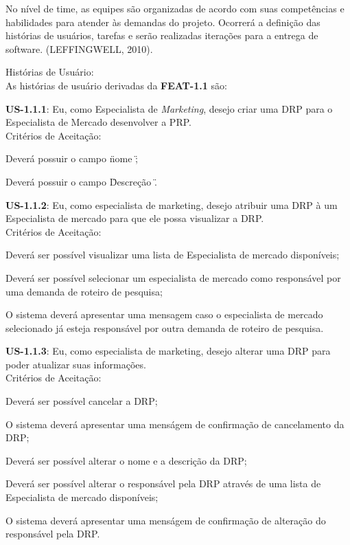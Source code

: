 			No nível de time, as equipes são organizadas de acordo com suas competências e habilidades para atender às demandas do projeto. Ocorrerá a definição das histórias de usuários, tarefas e serão realizadas iterações para a entrega de software. (LEFFINGWELL, 2010).

			\begin{itemize}
			{
				\item Histórias de Usuário:\\
				As histórias de usuário derivadas da \textbf{FEAT-1.1} são:
				\begin{itemize}
				{
					\item \textbf{US-1.1.1}: Eu, como Especialista de \textit{Marketing}, desejo criar uma DRP para o Especialista de Mercado desenvolver a PRP.\\
					Critérios de Aceitação:
						\begin{enumerate}
						{
							\item Deverá possuir o campo \" nome \";
							\item Deverá possuir o campo \" Descreção \".
						}
						\end{enumerate}

					\item \textbf{US-1.1.2}: Eu, como especialista de marketing, desejo atribuir uma DRP à um Especialista de mercado para que ele possa visualizar a DRP.\\
					Critérios de Aceitação:
						\begin{enumerate}
						{
							\item Deverá ser possível visualizar uma lista de Especialista de mercado disponíveis;
							\item Deverá ser possível selecionar um especialista de mercado como responsável por uma demanda de roteiro de pesquisa;
							\item O sistema deverá apresentar uma mensagem caso o especialista de mercado selecionado já esteja responsável por outra demanda de roteiro de pesquisa.
						}
						\end{enumerate}

					\item \textbf{US-1.1.3}: Eu, como especialista de marketing, desejo alterar uma DRP para poder atualizar suas informações.\\
					Critérios de Aceitação:
						\begin{enumerate}
						{
							\item Deverá ser possível cancelar a DRP;
							\item O sistema deverá apresentar uma menságem de confirmação de cancelamento da DRP;
							\item Deverá ser possível alterar o nome e a descrição da DRP;
							\item Deverá ser possível alterar o responsável pela DRP através de uma lista de Especialista de mercado disponíveis;
							\item O sistema deverá apresentar uma menságem de confirmação de alteração do responsável pela DRP.\\
						}
						\end{enumerate}

}
\end{itemize}}
\end{itemize}
